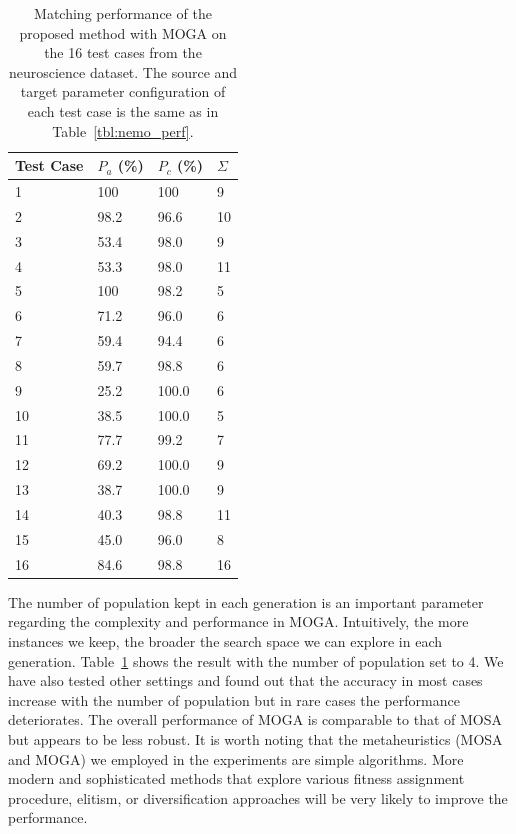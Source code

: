 \begin{table}[tbh]
\begin{center}
\begin{tabular}{l|l|l|l}
\hline
Test Case	&	$P_a$ (\%)	&	$P_c$ (\%) &   $\Sigma$    \\
\hline
1	&	100	&	100	  &   9\\
2	&	98.2	&	96.6	&   10\\
3	&	53.4	&	98.0	 &  9\\
4	&	53.3	&	98.0	&   11\\
5	&	100	&	98.2	&    5\\
6	&	71.2	&	96.0	&   6\\
7	&	59.4	&	94.4	&   6\\
8	&	59.7	&	98.8	&   6\\
9	&	25.2	&	100.0	&6 \\
10	&	38.5	&	100.0	& 5\\
11	&	77.7	&	99.2	&  7\\
12	&	69.2	&	100.0	& 9\\
13	&	38.7	&	100.0	& 9\\
14	&	40.3	&	98.8	&  11\\
15	&	45.0	&	96.0	&  8\\
16	&	84.6	&	98.8	&  16\\
\hline
\end{tabular}
\end{center}
\caption{\label{tbl:moga_neuro} Matching performance of the proposed method with MOGA on the 16 test cases from the neuroscience dataset. The source and target parameter configuration of each test case is the same as in Table~\ref{tbl:nemo_perf}.}
\end{table}

The number of population kept in each generation is an important parameter regarding the complexity and performance in MOGA. Intuitively, the more instances we keep, the broader the search space we can explore in each generation. Table~\ref{tbl:moga_neuro} shows the result with the number of population set to 4. We have also tested other settings and found out that the accuracy in most cases increase with the number of population but in rare cases the performance deteriorates. The overall performance of MOGA is comparable to that of MOSA but appears to be less robust. It is worth noting that the metaheuristics (MOSA and MOGA) we employed in the experiments are simple algorithms. More modern and sophisticated methods that explore various fitness assignment procedure, elitism, or diversification approaches will be very likely to improve the performance.


